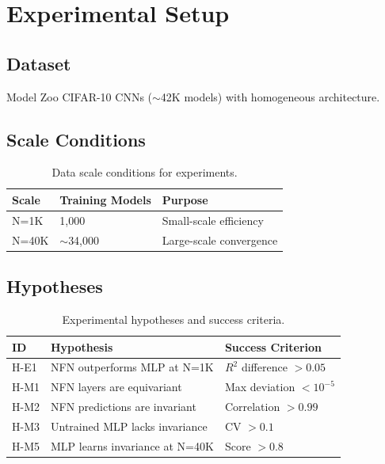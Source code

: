 \section{Experimental Setup}

\subsection{Dataset}

Model Zoo CIFAR-10 CNNs ($\sim$42K models) with homogeneous architecture.

\subsection{Scale Conditions}

\begin{table}[h]
\centering
\begin{tabular}{@{}lll@{}}
\toprule
Scale & Training Models & Purpose \\
\midrule
N=1K & 1,000 & Small-scale efficiency \\
N=40K & $\sim$34,000 & Large-scale convergence \\
\bottomrule
\end{tabular}
\caption{Data scale conditions for experiments.}
\label{tab:scales}
\end{table}

\subsection{Hypotheses}

\begin{table}[h]
\centering
\begin{tabular}{@{}llp{4cm}@{}}
\toprule
ID & Hypothesis & Success Criterion \\
\midrule
H-E1 & NFN outperforms MLP at N=1K & $R^2$ difference $> 0.05$ \\
H-M1 & NFN layers are equivariant & Max deviation $< 10^{-5}$ \\
H-M2 & NFN predictions are invariant & Correlation $> 0.99$ \\
H-M3 & Untrained MLP lacks invariance & CV $> 0.1$ \\
H-M5 & MLP learns invariance at N=40K & Score $> 0.8$ \\
\bottomrule
\end{tabular}
\caption{Experimental hypotheses and success criteria.}
\label{tab:hypotheses}
\end{table}
